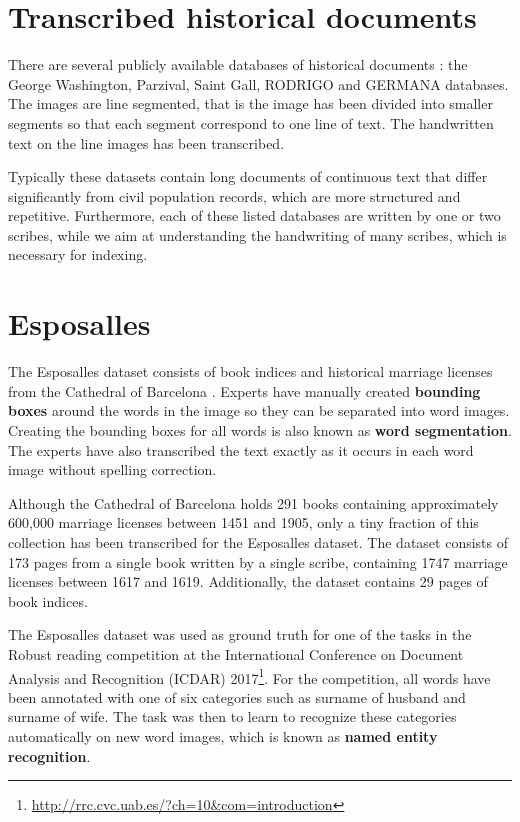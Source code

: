 \newpage
\section{Transcribed historical documents}

There are several publicly available databases of historical documents \cite{esposalles}: the George Washington, Parzival, Saint Gall, RODRIGO and GERMANA databases. The images are line segmented, that is the image has been divided into smaller segments so that each segment correspond to one line of text. The handwritten text on the line images has been transcribed.

Typically these datasets contain long documents of continuous text that differ significantly from civil population records, which are more structured and repetitive. Furthermore, each of these listed databases are written by one or two scribes, while we aim at understanding the handwriting of many scribes, which is necessary for indexing.

\section{Esposalles}
The Esposalles dataset consists of book indices and historical marriage licenses from the Cathedral of Barcelona \cite{esposalles}.
Experts have manually created \textbf{bounding boxes} around the words in the image so they can be separated into word images. Creating the bounding boxes for all words is also known as \textbf{word segmentation}.
The experts have also transcribed the text exactly as it occurs in each word image without spelling correction.

Although the Cathedral of Barcelona holds 291 books containing approximately 600,000 marriage licenses between 1451 and 1905, only a tiny fraction of this collection has been transcribed for the Esposalles dataset. The dataset consists of 173 pages from a single book written by a single scribe, containing 1747 marriage licenses between 1617 and 1619. Additionally, the dataset contains 29 pages of book indices.

The Esposalles dataset was used as ground truth for one of the tasks in the Robust reading competition at the International Conference on Document Analysis and Recognition (ICDAR) 2017\footnote{\url{http://rrc.cvc.uab.es/?ch=10&com=introduction}}.
For the competition, all words have been annotated with one of six categories such as
surname of husband and surname of wife. The task was then to learn to recognize these categories automatically on new word images, which is known as \textbf{named entity recognition}.

